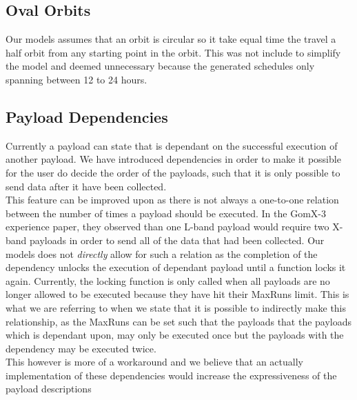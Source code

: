 \subsection{Oval Orbits}
Our models assumes that an orbit is circular so it take equal time the travel a half orbit from any starting point in the orbit. This was not include to simplify the model and deemed unnecessary because the generated schedules only spanning between 12 to 24 hours. 

\subsection{Payload Dependencies}
Currently a payload can state that is dependant on the successful execution of another payload. We have introduced dependencies in order to make it possible for the user do decide the order of the payloads, such that it is only possible to send data after it have been collected.\\
This feature can be improved upon as there is not always a one-to-one relation between the number of times a payload should be executed. In the GomX-3 experience paper\cite{gomx3}, they observed than one L-band payload would require two X-band payloads in order to send all of the data that had been collected. Our models does not \textit{directly} allow for such a relation as the completion of the dependency unlocks the execution of dependant payload until a function locks it again. Currently, the locking function is only called when all payloads are no longer allowed to be executed because they have hit their MaxRuns limit. This is what we are referring to when we state that it is possible to indirectly make this relationship, as the MaxRuns can be set such that the payloads that the payloads which is dependant upon, may only be executed once but the payloads with the dependency may be executed twice.\\
This however is more of a workaround and we believe that an actually implementation of these dependencies would increase the expressiveness of the payload descriptions

